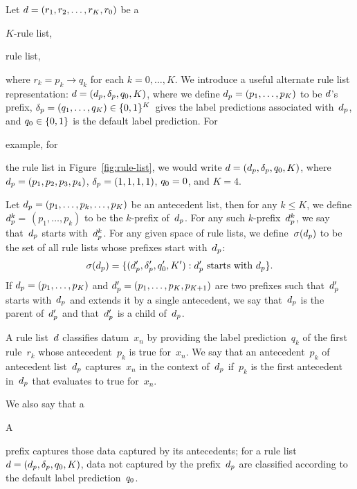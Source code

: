 Let ${{d} = (r_1, r_2, \dots, r_K, r_0)}$ be a
\begin{arxiv}
$K$-rule list,
\end{arxiv}
\begin{kdd}
rule list,
\end{kdd}
where ${r_k = p_k \rightarrow q_k}$ for each ${k = 0, \dots, K}$.
%
We introduce a useful alternate rule list representation:
${{d} = (d_p, \delta_p, q_0, K)}$,
where we define ${d_p = (p_1, \dots, p_K)}$ to be ${d}$'s prefix,
${\delta_p = (q_1, \dots, q_K) \in \{0, 1\}^K}$~gives
the label predictions associated with~$d_p$,
and ${q_0 \in \{0, 1\}}$ is the default label prediction.
%
For
\begin{arxiv}
example, for
\end{arxiv}
the rule list in Figure~\ref{fig:rule-list},
we would write ${{d} = (d_p, \delta_p, q_0, K)}$,
where ${d_p = (p_1, p_2, p_3, p_4)}$, ${\delta_p = (1, 1, 1, 1)}$,
${q_0 = 0}$, and ${K=4}$.

Let ${d_p = (p_1, \dots, p_k, \dots, p_K)}$ be an antecedent list,
then for any ${k \le K}$, we define ${d_p^k =}$ ${(p_1, \dots, p_k)}$
to be the $k$-prefix of~$d_p$.
%
For any such $k$-prefix~$d_p^k$,
we say that~$d_p$ starts with~$d_p^k$.
%
For any given space of rule lists,
we define~$\sigma(d_p)$ to be the set of
all rule lists whose prefixes start with~$d_p$:
\begin{align}
\sigma(d_p) =
\{(d_p', \delta_p', q_0', K') : d_p' \textnormal{ starts with } d_p \}.
\label{eq:starts-with}
\end{align}
%
If ${d_p = (p_1, \dots, p_K)}$ and ${d_p' = (p_1, \dots, p_K, p_{K+1})}$
are two prefixes such that~$d_p'$ starts with~$d_p$ and extends it by
a single antecedent, we say that~$d_p$ is the parent of~$d_p'$
and that~$d_p'$ is a child of~$d_p$.

A rule list~${d}$ classifies datum~$x_n$ by providing the label prediction~$q_k$
of the first rule~$r_k$ whose antecedent~$p_k$ is true for~$x_n$.
%
We say that an antecedent~$p_k$ of antecedent list~$d_p$ captures~$x_n$
in the context of~$d_p$ if~$p_k$ is the first antecedent in~$d_p$ that
evaluates to true for~$x_n$.
%
\begin{arxiv}
We also say that a
\end{arxiv}
\begin{kdd}
A
\end{kdd}
prefix captures those data captured by its antecedents;
for a rule list~${{d} = (d_p, \delta_p, q_0, K)}$,
data not captured by the prefix~$d_p$
are classified according to the default label prediction~$q_0$.

